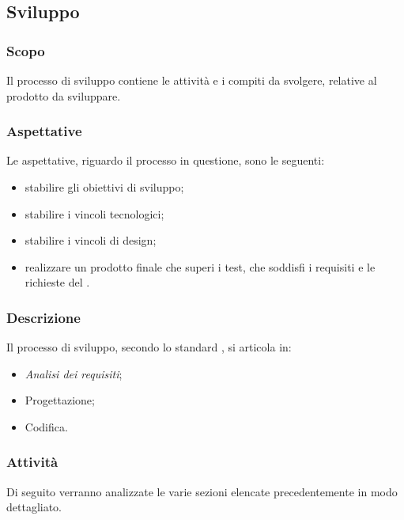	\subsection{Sviluppo}
		\subsubsection{Scopo}
		Il processo di sviluppo contiene le attività e i compiti da svolgere, relative al prodotto da sviluppare.
		\subsubsection{Aspettative}
		Le aspettative, riguardo il processo in questione, sono le seguenti:
		\begin{itemize}
			\item stabilire gli obiettivi di sviluppo;
			\item stabilire i vincoli tecnologici;
			\item stabilire i vincoli di design;
			\item realizzare un prodotto finale che superi i test, che soddisfi i requisiti e le richieste del .
		\end{itemize}
		\subsubsection{Descrizione}
		Il processo di sviluppo, secondo lo standard , si articola in:
		\begin{itemize}
			\item \textit{Analisi dei requisiti};
			\item Progettazione;
			\item Codifica.
		\end{itemize}
		\subsubsection{Attività}
		Di seguito verranno analizzate le varie sezioni elencate precedentemente in modo dettagliato.

